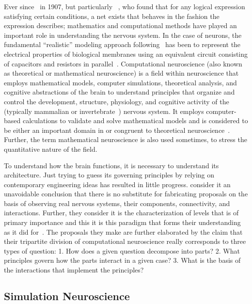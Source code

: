 \documentclass[11pt,3p,twocolumn]{JMN}
\begin{document}
Ever since~\citet{lapicque07} in 1907, but particularly ~\citet{mcculloch43}, who found that for any logical expression satisfying certain conditions, a net exists that behaves in the fashion the expression describes; mathematics and computational methods have played an important role in understanding the nervous system. In the case of neurons, the fundamental ``realistic'' modeling approach following~\citet{hodgkin52e} has been to represent the electrical properties of biological membranes using an equivalent circuit consisting of capacitors and resistors in parallel~\citep[more recently, see][]{bedard13}. Computational neuroscience (also known as theoretical or mathematical neuroscience) is a field within neuroscience that employs mathematical models, computer simulations, theoretical analysis, and cognitive abstractions of the brain to understand principles that organize and control the development, structure, physiology, and cognitive activity of the (typically mammalian or invertebrate~\cite[for example,][]{}) nervous system. It employs computer-based calculations to validate and solve mathematical models and is considered to be either an important domain in or congruent to theoretical neuroscience~\citep{trappenberg23}. Further, the term mathematical neuroscience is also used sometimes, to stress the quantitative nature of the field.

To understand how the brain functions, it is necessary to understand its architecture. Just trying to guess its governing principles by relying on contemporary engineering ideas has resulted in little progress. \citet*{Churchland:1992uq} consider it an unavoidable conclusion that there is no substitute for fabricating proposals on the basis of observing real nervous systems, their components, connectivity, and interactions. Further, they consider it is the characterization of levels that is of primary importance and this it is this paradigm that forms their understanding as it did for~\citet{Marr:1982fk}. The proposals they make are further elaborated by the claim that their tripartite division of computational neuroscience really corresponds to three types of question: 1. How does a given question decompose into parts? 2. What principles govern how the parts interact in a given case? 3. What is the basis of the interactions that implement the principles?

\subsection{Simulation Neuroscience}
\label{subsection:simneuro}
\end{document}
